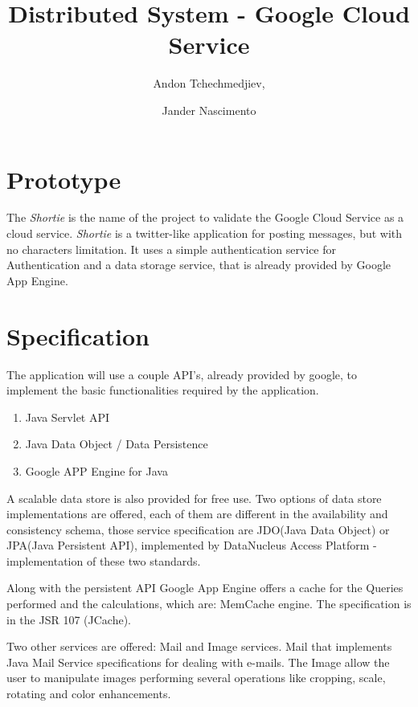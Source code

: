 \documentclass{article}
\begin{document}
\title{Distributed System - Google Cloud Service}

\author{Andon Tchechmedjiev, 
\and Jander Nascimento}

\maketitle

\section{Prototype}

The \emph{Shortie} is the name of the project to validate the Google Cloud Service as a cloud service.
\emph{Shortie} is a twitter-like application for posting messages, but with no characters limitation. It uses a simple authentication service for Authentication and a data storage service, that is already provided by Google App Engine.

\section{Specification}

The application will use a couple API's, already provided by google, to implement the basic functionalities required by the application. 

\begin{enumerate}
\item Java Servlet API
\item Java Data Object / Data Persistence	
\item Google APP Engine for Java
\end{enumerate}


A scalable data store is also provided for free use. Two options of data store implementations are offered, each of them are different in the availability and consistency schema, those service specification are JDO(Java Data Object) or JPA(Java Persistent API), implemented by DataNucleus Access Platform - implementation of these two standards.

Along with the persistent API Google App Engine offers a cache for the Queries performed and the calculations, which are: MemCache engine. The specification is in the JSR 107 (JCache).

Two other services are offered: Mail and Image services. Mail that implements Java Mail Service specifications for dealing with e-mails. The Image allow the user to manipulate images performing several operations like cropping, scale, rotating and color enhancements.
\end{document}
